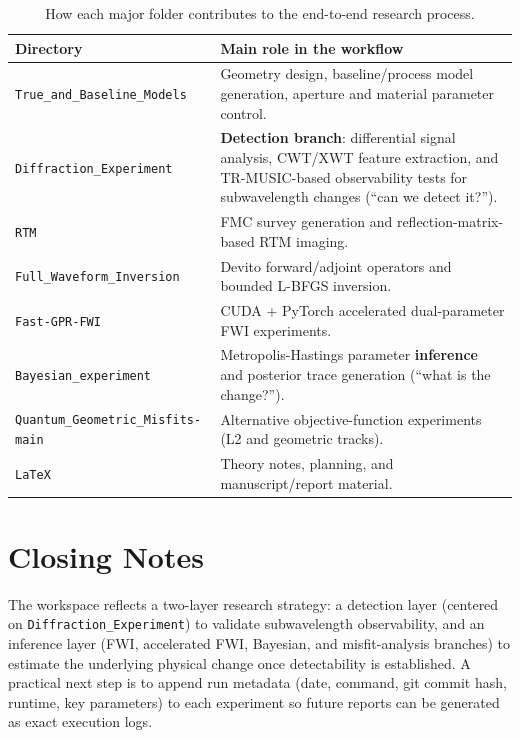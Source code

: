 \documentclass[11pt,a4paper]{article}
\newcommand{\repo}[1]{\texttt{#1}}
\begin{document}
\begin{table}[h!]
\centering
\small
\begin{tabular}{@{}p{}p{}@{}}
\toprule
Directory & Main role in the workflow \\
\midrule
\repo{True\_and\_Baseline\_Models} & Geometry design, baseline/process model generation, aperture and material parameter control. \\
\repo{Diffraction\_Experiment} & \textbf{Detection branch}: differential signal analysis, CWT/XWT feature extraction, and TR-MUSIC-based observability tests for subwavelength changes (``can we detect it?''). \\
\repo{RTM} & FMC survey generation and reflection-matrix-based RTM imaging. \\
\repo{Full\_Waveform\_Inversion} & Devito forward/adjoint operators and bounded L-BFGS inversion. \\
\repo{Fast-GPR-FWI} & CUDA + PyTorch accelerated dual-parameter FWI experiments. \\
\repo{Bayesian\_experiment} & Metropolis-Hastings parameter \textbf{inference} and posterior trace generation (``what is the change?''). \\
\repo{Quantum\_Geometric\_Misfits-main} & Alternative objective-function experiments (L2 and geometric tracks). \\
\repo{LaTeX} & Theory notes, planning, and manuscript/report material. \\
\bottomrule
\end{tabular}
\caption{How each major folder contributes to the end-to-end research process.}
\label{tab:dir-map}
\end{table}

\section{Closing Notes}
The workspace reflects a two-layer research strategy: a detection layer (centered on \repo{Diffraction\_Experiment}) to validate subwavelength observability, and an inference layer (FWI, accelerated FWI, Bayesian, and misfit-analysis branches) to estimate the underlying physical change once detectability is established.
A practical next step is to append run metadata (date, command, git commit hash, runtime, key parameters) to each experiment so future reports can be generated as exact execution logs.
\end{document}

